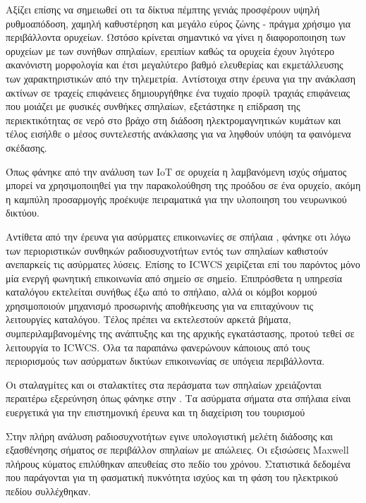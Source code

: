 \documentclass[12pt]{article}
\begin{document}
\begin{multicols*}{2}
        Αξίζει επίσης να σημειωθεί οτι τα δίκτυα πέμπτης γενιάς προσφέρουν υψηλή ρυθμοαπόδοση,
        χαμηλή καθυστέρηση και μεγάλο εύρος ζώνης - πράγμα χρήσιμο για περιβάλλοντα ορυχείων.
        Ωστόσο κρίνεται σημαντικό να γίνει η διαφοροποιηση των ορυχείων με των συνήθων σπηλαίων,
        ερειπίων καθώς τα ορυχεία έχουν λιγότερο ακανόνιστη μορφολογία και έτσι μεγαλύτερο βαθμό
        ελευθερίας και εκμετάλλευσης των χαρακτηριστικών από την τηλεμετρία. Αντίστοιχα στην έρευνα
        για την ανάκλαση ακτίνων σε τραχείς επιφάνειες \cite{soo_investigation_2018} δημιουργήθηκε
        ένα τυχαίο προφίλ τραχιάς επιφάνειας που μοιάζει με φυσικές συνθήκες σπηλαίων, εξετάστηκε
        η επίδραση της περιεκτικότητας σε νερό στο βράχο στη διάδοση ηλεκτρομαγνητικών κυμάτων και
        τέλος εισήλθε ο μέσος συντελεστής ανάκλασης για να ληφθούν υπόψη τα φαινόμενα σκέδασης.

        Όπως φάνηκε από την ανάλυση των IoT σε ορυχεία \cite{ming_study_2019} η λαμβανόμενη ισχύς
        σήματος μπορεί να χρησιμοποιηθεί για την παρακολούθηση της προόδου σε ένα ορυχείο, ακόμη 
        η καμπύλη προσαρμογής προέκυψε πειραματικά για την υλοποιηση του νευρωνικού δικτύου.

        Αντίθετα από την έρευνα για ασύρματες επικοινωνίες σε σπήλαια \cite{yavuz_-cave_2009},
        φάνηκε οτι λόγω των περιοριστικών συνθηκών ραδιοσυχνοτήτων εντός των σπηλαίων καθιστούν
        ανεπαρκείς τις ασύρματες λύσεις. Επίσης το ICWCS χειρίζεται επί του παρόντος μόνο μία
        ενεργή φωνητική επικοινωνία από σημείο σε σημείο. Επιπρόσθετα η υπηρεσία καταλόγου
        εκτελείται συνήθως έξω από το σπήλαιο, αλλά οι κόμβοι κορμού χρησιμοποιούν μηχανισμό
        προσωρινής αποθήκευσης για να επιταχύνουν τις λειτουργίες καταλόγου. Τέλος πρέπει να
        εκτελεστούν αρκετά βήματα, συμπεριλαμβανομένης της ανάπτυξης και της αρχικής εγκατάστασης,
        προτού τεθεί σε λειτουργία το ICWCS. Όλα τα παραπάνω φανερώνουν κάποιους από τους
        περιορισμούς των ασύρματων δικτύων επικοινωνίας σε υπόγεια περιβάλλοντα.

        Οι σταλαγμίτες και οι σταλακτίτες στα περάσματα των σπηλαίων χρειάζονται περαιτέρω
        εξερεύνηση όπως φάνηκε στην \cite{soo_propagation_2018}.
        Τα ασύρματα σήματα στα σπήλαια είναι ευεργετικά για την επιστημονική έρευνα και τη 
        διαχείριση του τουρισμού

        Στην πλήρη ανάλυση ραδιοσυχνοτήτων \cite{pingenot_full_2005} εγινε υπολογιστική μελέτη
        διάδοσης και εξασθένησης σήματος σε περιβάλλον σπηλαίων με απώλειες. Οι εξισώσεις Maxwell
        πλήρους κύματος επιλύθηκαν απευθείας στο πεδίο του χρόνου. Στατιστικά δεδομένα που παράγονται
        για τη φασματική πυκνότητα ισχύος και τη φάση του ηλεκτρικού πεδίου συλλέχθηκαν.


\end{multicols*}
\end{document}
